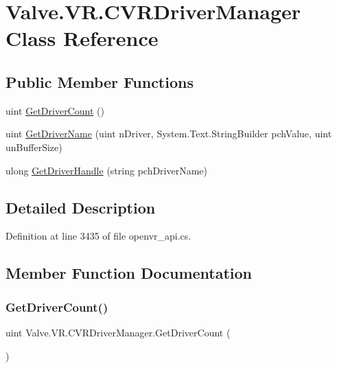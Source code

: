 \hypertarget{class_valve_1_1_v_r_1_1_c_v_r_driver_manager}{}\section{Valve.\+V\+R.\+C\+V\+R\+Driver\+Manager Class Reference}
\label{class_valve_1_1_v_r_1_1_c_v_r_driver_manager}
\subsection*{Public Member Functions}
\begin{DoxyCompactItemize}
\item 
uint \mbox{\hyperlink{class_valve_1_1_v_r_1_1_c_v_r_driver_manager_a1529b0736e0fc4bf5f8b77761e496555}{Get\+Driver\+Count}} ()
\item 
uint \mbox{\hyperlink{class_valve_1_1_v_r_1_1_c_v_r_driver_manager_ab33e5900d764b45519311eb5891b9316}{Get\+Driver\+Name}} (uint n\+Driver, System.\+Text.\+String\+Builder pch\+Value, uint un\+Buffer\+Size)
\item 
ulong \mbox{\hyperlink{class_valve_1_1_v_r_1_1_c_v_r_driver_manager_a5cfb39c1e3ec13c84ea41eae3c85d73a}{Get\+Driver\+Handle}} (string pch\+Driver\+Name)
\end{DoxyCompactItemize}


\subsection{Detailed Description}


Definition at line 3435 of file openvr\+\_\+api.\+cs.



\subsection{Member Function Documentation}
\mbox{\label{class_valve_1_1_v_r_1_1_c_v_r_driver_manager_a1529b0736e0fc4bf5f8b77761e496555}} 
\subsubsection{\texorpdfstring{GetDriverCount()}{GetDriverCount()}}
{\footnotesize\ttfamily uint Valve.\+V\+R.\+C\+V\+R\+Driver\+Manager.\+Get\+Driver\+Count (\begin{DoxyParamCaption}{ }\end{DoxyParamCaption})}



